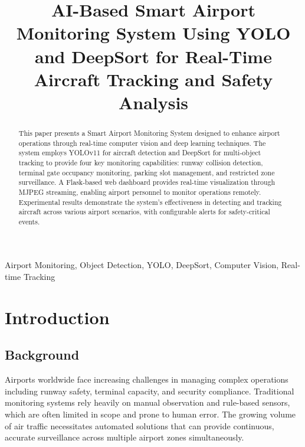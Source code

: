 \documentclass[conference]{IEEEtran}
\begin{document}
\title{AI-Based Smart Airport Monitoring System Using
YOLO and DeepSort for Real-Time Aircraft
Tracking and Safety Analysis}

\author{
}

\maketitle

\begin{abstract}
This paper presents a Smart Airport Monitoring System designed to enhance airport operations through real-time computer vision and deep learning techniques. The system employs YOLOv11 for aircraft detection and DeepSort for multi-object tracking to provide four key monitoring capabilities: runway collision detection, terminal gate occupancy monitoring, parking slot management, and restricted zone surveillance. A Flask-based web dashboard provides real-time visualization through MJPEG streaming, enabling airport personnel to monitor operations remotely. Experimental results demonstrate the system's effectiveness in detecting and tracking aircraft across various airport scenarios, with configurable alerts for safety-critical events.
\end{abstract}

\begin{IEEEkeywords}
Airport Monitoring, Object Detection, YOLO, DeepSort, Computer Vision, Real-time Tracking
\end{IEEEkeywords}

\section{Introduction}
\label{sec:introduction}

\subsection{Background}
Airports worldwide face increasing challenges in managing complex operations including runway safety, terminal capacity, and security compliance. Traditional monitoring systems rely heavily on manual observation and rule-based sensors, which are often limited in scope and prone to human error. The growing volume of air traffic necessitates automated solutions that can provide continuous, accurate surveillance across multiple airport zones simultaneously.
\end{document}
